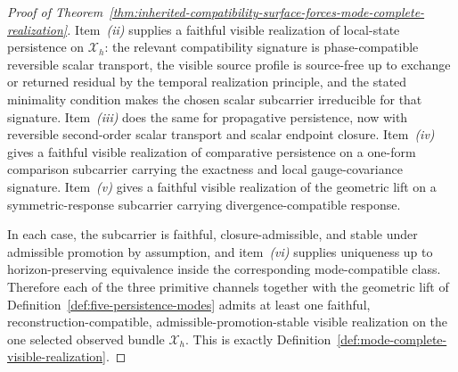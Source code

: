 \begin{proof}[Proof of Theorem~\ref{thm:inherited-compatibility-surface-forces-mode-complete-realization}]
\label{proof:thm:inherited-compatibility-surface-forces-mode-complete-realization}
Item~\emph{(ii)} supplies a faithful visible realization of local-state
persistence on \(\mathcal X_h\): the relevant compatibility signature is
phase-compatible reversible scalar transport, the visible source profile is
source-free up to exchange or returned residual by the temporal realization
principle, and the stated minimality condition makes the chosen scalar
subcarrier irreducible for that signature. Item~\emph{(iii)} does the same for
propagative persistence, now with reversible second-order scalar transport and
scalar endpoint closure. Item~\emph{(iv)} gives a faithful visible realization
of comparative persistence on a one-form comparison subcarrier carrying the
exactness and local gauge-covariance signature. Item~\emph{(v)} gives a faithful
visible realization of the geometric lift on a symmetric-response subcarrier
carrying divergence-compatible response.

In each case, the subcarrier is faithful, closure-admissible, and stable under
admissible promotion by assumption, and item~\emph{(vi)} supplies uniqueness
up to horizon-preserving equivalence inside the corresponding mode-compatible
class. Therefore each of the three primitive channels together with the
geometric lift of Definition~\ref{def:five-persistence-modes} admits at least
one faithful, reconstruction-compatible, admissible-promotion-stable visible
realization on the one selected observed bundle \(\mathcal X_h\). This is
exactly Definition~\ref{def:mode-complete-visible-realization}.
\end{proof}

